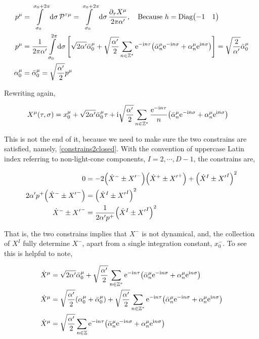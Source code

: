 \begin{align*}
    p^\mu&=\int\limits_{\sigma_0}^{\sigma_0+2\pi}\dd{\sigma}\mathcal P^{\tau\mu}=\int\limits_{\sigma_0}^{\sigma_0+2\pi}\dd{\sigma}\frac{\partial_\tau X^\mu}{2\pi\alpha'},\ \ \ \textnormal{Because }h=\textnormal{Diag}\mqty(-1&1)\\
    p^\mu&=\frac{1}{2\pi\alpha'}\int\limits_{\sigma_0}^{2\pi}\dd{\sigma}\qty[\sqrt{2\alpha'}{\bar\alpha_0}^\mu+\sqrt{\frac{\alpha'}{2}}\sum\limits_{n\in\mathbb Z^\ast}\e^{-\im n\tau}\qty({\bar\alpha}_n^\mu\e^{-\im n\sigma}+{\alpha}_n^\mu\e^{\im n\sigma})]=\sqrt{\frac{2}{\alpha'}}{\bar\alpha}_0^\mu\\
    \alpha_0^\mu&={\bar\alpha}_0^\mu=\sqrt{\frac{\alpha'}{2}}p^\mu
\end{align*}

Rewriting again,

\begin{align*}
    X^\mu\qty(\tau,\sigma)&=x_{0}^\mu+\sqrt{2\alpha'}{\bar\alpha}_0^\mu\tau+\textnormal{i}\sqrt{\frac{\alpha'}{2}}\sum\limits_{n\in\mathbb Z^\ast}\frac{\textnormal{e}^{-\textnormal{i} n\tau}}{n}\qty({\bar\alpha}^\mu_n\textnormal{e}^{-\textnormal{i} n\sigma}+{\alpha}^\mu_n\textnormal{e}^{\textnormal{i} n\sigma})
\end{align*}

This is not the end of it, because we need to make sure the two constrains are satisfied, namely, \ref{constrains2closed}. With the convention of 
uppercase Latin index referring to non-light-cone components, $I=2,\cdots,D-1$, the constrains are,

\begin{align*}
    0&=-2\qty({\dot X}^-\pm{X'}^-)\qty({\dot X}^+\pm{X'}^+)+\qty({\dot X}^I\pm{X'}^I)^2\\
    2\alpha'p^+\qty({\dot X}^-\pm{X'}^-)&=\qty({\dot X}^I\pm{X'}^I)^2\\
    {\dot X}^-\pm{X'}^-&=\frac{1}{2\alpha'p^+}\qty({\dot X}^I\pm{X'}^I)^2
\end{align*}

That is, the two constrains implies that $X^-$ is not dynamical, and, the collection of $X^I$ fully determine $X^-$, 
apart from a single integration constant, $x_0^-$. To see this is helpful to note,

\begin{align*}
    {\dot X}^\mu&=\sqrt{2\alpha'}{\bar\alpha}_0^\mu+\sqrt{\frac{\alpha'}{2}}\sum\limits_{n\in\mathbb Z^\ast}\textnormal{e}^{-\textnormal{i} n\tau}\qty({\bar\alpha}^\mu_n\textnormal{e}^{-\textnormal{i} n\sigma}+{\alpha}^\mu_n\textnormal{e}^{\textnormal{i} n\sigma})\\
    {\dot X}^\mu&=\sqrt{\frac{\alpha'}{2}}\qty(\alpha_0^\mu+{\bar\alpha}_0^\mu)+\sqrt{\frac{\alpha'}{2}}\sum\limits_{n\in\mathbb Z^\ast}\textnormal{e}^{-\textnormal{i} n\tau}\qty({\bar\alpha}^\mu_n\textnormal{e}^{-\textnormal{i} n\sigma}+{\alpha}^\mu_n\textnormal{e}^{\textnormal{i} n\sigma})\\
    {\dot X}^\mu&=\sqrt{\frac{\alpha'}{2}}\sum\limits_{n\in\mathbb Z}\textnormal{e}^{-\textnormal{i} n\tau}\qty({\bar\alpha}^\mu_n\textnormal{e}^{-\textnormal{i} n\sigma}+{\alpha}^\mu_n\textnormal{e}^{\textnormal{i} n\sigma})
\end{align*}

